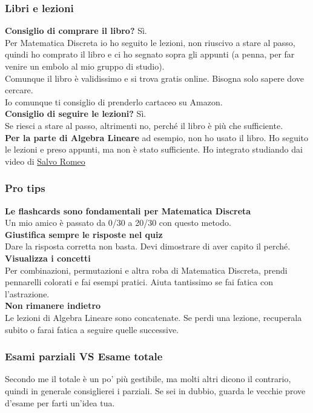 \documentclass[18pt]{extarticle}
\begin{document}
\subsubsection{Libri e lezioni}
\textbf{Consiglio di comprare il libro?} Sì.\\
Per Matematica Discreta io ho seguito le lezioni, non riuscivo a stare al passo, quindi ho comprato il libro e ci ho segnato sopra gli appunti (a penna, per far venire un embolo al mio gruppo di studio).\\
Comunque il libro è validissimo e si trova gratis online. Bisogna solo sapere dove cercare.\\
Io comunque ti consiglio di prenderlo cartaceo su Amazon.\\
\textbf{Consiglio di seguire le lezioni?} Sì.\\
Se riesci a stare al passo, altrimenti no, perché il libro è più che sufficiente.\\
\textbf{Per la parte di Algebra Lineare} ad esempio, non ho usato il libro.  Ho seguito le lezioni e preso appunti, ma non è stato sufficiente. Ho integrato studiando dai video di \href{https://www.youtube.com/playlist?list=PLW4IfhQEjCpJaWnqvWGliPiiL1q8QejNL}{Salvo Romeo}\\



\subsubsection{Pro tips}
\textbf{Le flashcards sono fondamentali per Matematica Discreta}\\
Un mio amico è passato da 0/30 a 20/30 con questo metodo.\\
\textbf{Giustifica sempre le risposte nel quiz}\\
Dare la risposta corretta non basta. Devi dimostrare di aver capito il perché.\\
\textbf{Visualizza i concetti}\\
Per combinazioni, permutazioni e altra roba di Matematica Discreta, prendi pennarelli colorati e fai esempi pratici. Aiuta tantissimo se fai fatica con l'astrazione.\\
\textbf{Non rimanere indietro}\\
Le lezioni di Algebra Lineare sono concatenate. Se perdi una lezione, recuperala subito o farai fatica a seguire quelle successive.

\subsubsection{Esami parziali VS Esame totale} 
Secondo me il totale è un po' più gestibile, ma molti altri dicono il contrario, quindi in generale consiglierei i parziali. Se sei in dubbio, guarda le vecchie prove d'esame per farti un'idea tua. 
\end{document}
